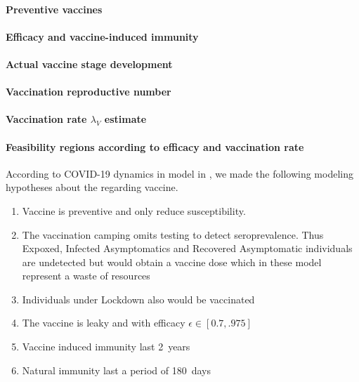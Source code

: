 \paragraph{Preventive vaccines}
\paragraph{Efficacy and vaccine-induced immunity}
\paragraph{Actual vaccine stage development}
\paragraph{Vaccination reproductive number}
\paragraph{Vaccination rate $\lambda_V$ estimate}
\paragraph{Feasibility regions according to efficacy and vaccination rate}
%
\begin{assumptions}
     According to COVID-19 dynamics in model in , we
     made the following modeling hypotheses about the regarding vaccine.
     \begin{enumerate}[(VH-1)]
        \item
            Vaccine is preventive and only reduce susceptibility.
        \item
            The vaccination camping omits testing to detect seroprevalence.
            Thus Expoxed, Infected Asymptomatics and Recovered Asymptomatic
            individuals are undetected but would obtain a vaccine dose
            \textemdash which in these model represent a waste of resources
        \item
            Individuals under Lockdown also would be vaccinated
        \item
            The vaccine is leaky and with efficacy $\epsilon \in[0.7, .975]$
        \item   
            Vaccine induced immunity last \SI{2}{years}
        \item   
            Natural immunity last a period of \SI{180}{days} 
     \end{enumerate}
\end{assumptions}


